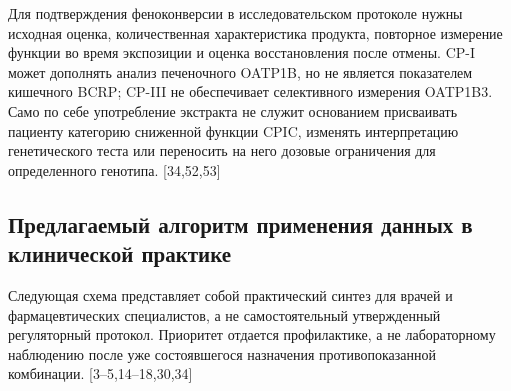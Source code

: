 \documentclass[11pt]{article}
\begin{document}
Для подтверждения феноконверсии в исследовательском протоколе нужны исходная оценка, количественная характеристика продукта, повторное измерение функции во время экспозиции и оценка восстановления после отмены. CP-I может дополнять анализ печеночного OATP1B, но не является показателем кишечного BCRP; CP-III не обеспечивает селективного измерения OATP1B3. Само по себе употребление экстракта не служит основанием присваивать пациенту категорию сниженной функции CPIC, изменять интерпретацию генетического теста или переносить на него дозовые ограничения для определенного генотипа. [34,52,53]

\subsection{Предлагаемый алгоритм применения данных в клинической практике}

Следующая схема представляет собой практический синтез для врачей и фармацевтических специалистов, а не самостоятельный утвержденный регуляторный протокол. Приоритет отдается профилактике, а не лабораторному наблюдению после уже состоявшегося назначения противопоказанной комбинации. [3--5,14--18,30,34]
\end{document}
